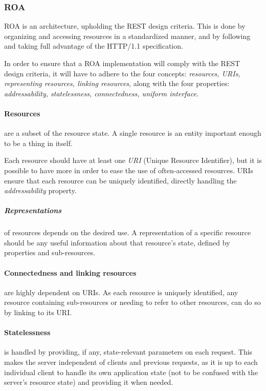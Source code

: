 \subsubsection{ROA}
ROA is an architecture, upholding the REST design criteria.
This is done by organizing and accessing resources in a standardized manner, and by following and taking full advantage of the HTTP/1.1 specification.

In order to ensure that a ROA implementation will comply with the REST design criteria, it will have to adhere to the four concepts: \textit{resources, URIs, representing resources, linking resources}, along with the four properties: \textit{addressability, statelessness, connectedness, uniform interface}.\cite[Chapter 4,]{restful_web_services}

\paragraph{Resources} are a subset of the resource state.
A single resource is an entity important enough to be a thing in itself.

Each resource should have at least one \textit{URI} (Unique Resource Identifier), but it is possible to have more in order to ease the use of often-accessed resources.
URIs ensure that each resource can be uniquely identified, directly handling the \textit{addressability} property.

\subparagraph{Representations} of resources depends on the desired use.
A representation of a specific resource should be any useful information about that resource's state, defined by properties and sub-resources.

\paragraph{Connectedness and linking resources} are highly dependent on URIs.
As each resource is uniquely identified, any resource containing sub-resources or needing to refer to other resources, can do so by linking to its URI. 

\paragraph{Statelessness} is handled by providing, if any, state-relevant parameters on each request.
This makes the server independent of clients and previous requests, as it is up to each individual client to handle its own application state (not to be confused with the server's resource state) and providing it when needed.

